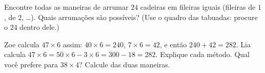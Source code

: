 \begin{exercise}[$\star\star$]\label{exo:g3:mult:11}
Encontre todas as maneiras de arrumar $24$ cadeiras em fileiras
iguais (fileiras de $1$, de $2$, \dots). Quais arrumações são
possíveis? (Use o quadro das tabuadas: procure o $24$ dentro dele.)
\end{exercise}

\begin{exercise}[$\star\star$]\label{exo:g3:mult:12}
Zoe calcula $47 \times 6$ assim: $40 \times 6 = 240$,
$7 \times 6 = 42$, e então $240 + 42 = 282$. Lia calcula
$47 \times 6 = 50 \times 6 - 3 \times 6 = 300 - 18 = 282$. Explique
cada método. Qual você prefere para $38 \times 4$? Calcule das duas
maneiras.
\end{exercise}
